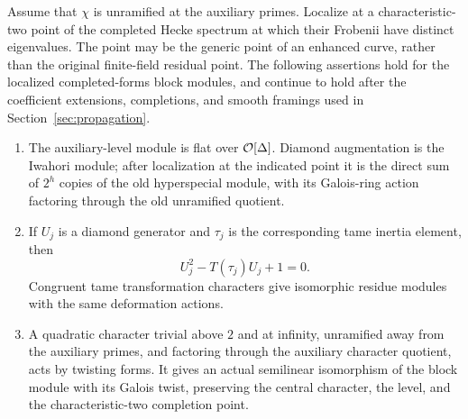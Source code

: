\begin{lemma}\label{lem:auxiliary-level}
Assume that \(\chi\) is unramified at the auxiliary
primes. Localize at a characteristic-two point of the
completed Hecke spectrum at which their Frobenii have
distinct eigenvalues. The point may be the generic
point of an enhanced curve, rather than the original
finite-field residual point. The following assertions
hold for the localized completed-forms block modules,
and continue to hold after the coefficient extensions,
completions, and smooth framings used in
Section~\ref{sec:propagation}.
\begin{enumerate}
\item The auxiliary-level module is flat over
\(\mathcal O[\Delta]\). Diamond augmentation is the Iwahori
module; after localization at the indicated point it is the
direct sum of \(2^h\) copies of the old hyperspecial
module, with its Galois-ring action factoring through
the old unramified quotient.
\item If \(U_j\) is a diamond generator and
\(\tau_j\) is the corresponding tame inertia element,
then
\[
 U_j^2-T(\tau_j)U_j+1=0.
\]
Congruent tame transformation characters give
isomorphic residue modules with the same deformation
actions.
\item A quadratic character trivial above \(2\) and at
infinity, unramified away from the auxiliary primes,
and factoring through the auxiliary character
quotient, acts by twisting forms. It gives an actual
semilinear isomorphism of the block module with its
Galois twist, preserving the central character, the
level, and the characteristic-two completion point.
\end{enumerate}
\end{lemma}
